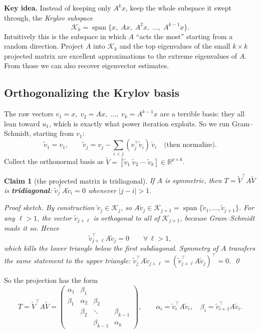 \documentclass[11pt]{article}
\newtheorem*{claimbox}{Claim}
\begin{document}
\textbf{Key idea.} Instead of keeping only $A^k x$, keep the whole subspace it swept through, the \emph{Krylov subspace}
\[
\mathcal{K}_k = \operatorname{span}\{x,\; Ax,\; A^2x,\; \dots,\; A^{k-1}x\}.
\]
Intuitively this is the subspace in which $A$ ``acts the most'' starting from a random direction. Project $A$ into $\mathcal{K}_k$ and the top eigenvalues of the small $k \times k$ projected matrix are excellent approximations to the extreme eigenvalues of $A$. From those we can also recover eigenvector estimates.

\subsection{Orthogonalizing the Krylov basis}

The raw vectors $v_1 = x,\; v_2 = Ax,\; \dots,\; v_k = A^{k-1}x$ are a terrible basis: they all lean toward $u_1$, which is exactly what power iteration exploits. So we run Gram--Schmidt, starting from $v_1$:
\[
\tilde v_1 = v_1, \qquad
\tilde v_j = v_j - \sum_{i < j} (v_j^\top \tilde v_i)\, \tilde v_i
\quad\text{(then normalize)} .
\]
Collect the orthonormal basis as $\tilde V = [\tilde v_1\; \tilde v_2\; \cdots\; \tilde v_k] \in \mathbb{R}^{p \times k}$.

\begin{claimbox}[the projected matrix is tridiagonal]
If $A$ is symmetric, then $T = \tilde V^\top A \tilde V$ is \textbf{tridiagonal}: $\tilde v_j^\top A \tilde v_i = 0$ whenever $|j - i| > 1$.

\emph{Proof sketch.} By construction $\tilde v_j \in \mathcal{K}_j$, so $A \tilde v_j \in \mathcal{K}_{j+1} = \operatorname{span}\{\tilde v_1, \dots, \tilde v_{j+1}\}$. For any $\ell > 1$, the vector $\tilde v_{j+\ell}$ is orthogonal to all of $\mathcal{K}_{j+1}$, because Gram--Schmidt made it so. Hence
\[
\tilde v_{j+\ell}^\top A \tilde v_j = 0 \qquad \forall\, \ell > 1,
\]
which kills the lower triangle below the first subdiagonal. Symmetry of $A$ transfers the same statement to the upper triangle: $\tilde v_j^\top A \tilde v_{j+\ell} = (\tilde v_{j+\ell}^\top A \tilde v_j)^\top = 0$. \qed
\end{claimbox}

So the projection has the form
\[
T = \tilde V^\top A \tilde V =
\begin{pmatrix}
\alpha_1 & \beta_1 & & \\
\beta_1 & \alpha_2 & \beta_2 & \\
 & \beta_2 & \ddots & \beta_{k-1} \\
 & & \beta_{k-1} & \alpha_k
\end{pmatrix},
\qquad
\alpha_i = \tilde v_i^\top A \tilde v_i, \quad
\beta_i = \tilde v_{i+1}^\top A \tilde v_i .
\]
\end{document}
